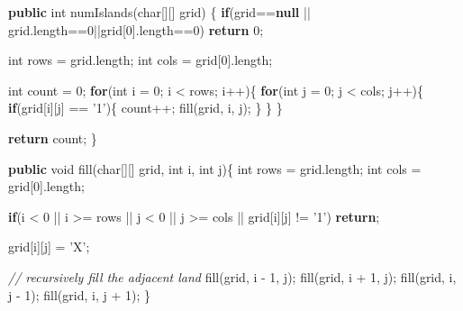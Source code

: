 \documentclass[]{book}
\newenvironment{Shaded}{\begin{snugshade}}{\end{snugshade}}
\newcommand{\CharTok}[1]{\textcolor[rgb]{0.31,0.60,0.02}{#1}}
\newcommand{\CommentTok}[1]{\textcolor[rgb]{0.56,0.35,0.01}{\textit{#1}}}
\newcommand{\DataTypeTok}[1]{\textcolor[rgb]{0.13,0.29,0.53}{#1}}
\newcommand{\DecValTok}[1]{\textcolor[rgb]{0.00,0.00,0.81}{#1}}
\newcommand{\FunctionTok}[1]{\textcolor[rgb]{0.00,0.00,0.00}{#1}}
\newcommand{\KeywordTok}[1]{\textcolor[rgb]{0.13,0.29,0.53}{\textbf{#1}}}
\newcommand{\NormalTok}[1]{#1}
\begin{document}
\begin{Shaded}
\begin{Highlighting}[]
\KeywordTok{public} \DataTypeTok{int} \FunctionTok{numIslands}\NormalTok{(}\DataTypeTok{char}\NormalTok{[][] grid) \{}
    \KeywordTok{if}\NormalTok{(grid==}\KeywordTok{null}\NormalTok{ || grid.}\FunctionTok{length}\NormalTok{==}\DecValTok{0}\NormalTok{||grid[}\DecValTok{0}\NormalTok{].}\FunctionTok{length}\NormalTok{==}\DecValTok{0}\NormalTok{)}
        \KeywordTok{return} \DecValTok{0}\NormalTok{;}

    \DataTypeTok{int}\NormalTok{ rows = grid.}\FunctionTok{length}\NormalTok{;}
    \DataTypeTok{int}\NormalTok{ cols = grid[}\DecValTok{0}\NormalTok{].}\FunctionTok{length}\NormalTok{;}

    \DataTypeTok{int}\NormalTok{ count = }\DecValTok{0}\NormalTok{;}
    \KeywordTok{for}\NormalTok{(}\DataTypeTok{int}\NormalTok{ i = }\DecValTok{0}\NormalTok{; i < rows; i++)\{}
        \KeywordTok{for}\NormalTok{(}\DataTypeTok{int}\NormalTok{ j = }\DecValTok{0}\NormalTok{; j < cols; j++)\{}
            \KeywordTok{if}\NormalTok{(grid[i][j] == }\CharTok{'1'}\NormalTok{)\{}
\NormalTok{                count++;}
                \FunctionTok{fill}\NormalTok{(grid, i, j);}
\NormalTok{            \}}
\NormalTok{        \}}
\NormalTok{    \}}


    \KeywordTok{return}\NormalTok{ count;}
\NormalTok{\}}

\KeywordTok{public} \DataTypeTok{void} \FunctionTok{fill}\NormalTok{(}\DataTypeTok{char}\NormalTok{[][] grid, }\DataTypeTok{int}\NormalTok{ i, }\DataTypeTok{int}\NormalTok{ j)\{}
    \DataTypeTok{int}\NormalTok{ rows = grid.}\FunctionTok{length}\NormalTok{;}
    \DataTypeTok{int}\NormalTok{ cols = grid[}\DecValTok{0}\NormalTok{].}\FunctionTok{length}\NormalTok{;}

    \KeywordTok{if}\NormalTok{(i < }\DecValTok{0}\NormalTok{ || i >= rows || j < }\DecValTok{0}\NormalTok{ || j >= cols || grid[i][j] != }\CharTok{'1'}\NormalTok{)}
        \KeywordTok{return}\NormalTok{;}

\NormalTok{    grid[i][j] = }\CharTok{'X'}\NormalTok{;}

    \CommentTok{// recursively fill the adjacent land}
    \FunctionTok{fill}\NormalTok{(grid, i - }\DecValTok{1}\NormalTok{, j);}
    \FunctionTok{fill}\NormalTok{(grid, i + }\DecValTok{1}\NormalTok{, j);}
    \FunctionTok{fill}\NormalTok{(grid, i, j - }\DecValTok{1}\NormalTok{);}
    \FunctionTok{fill}\NormalTok{(grid, i, j + }\DecValTok{1}\NormalTok{);}
\NormalTok{\}}
\end{Highlighting}
\end{Shaded}
\end{document}
